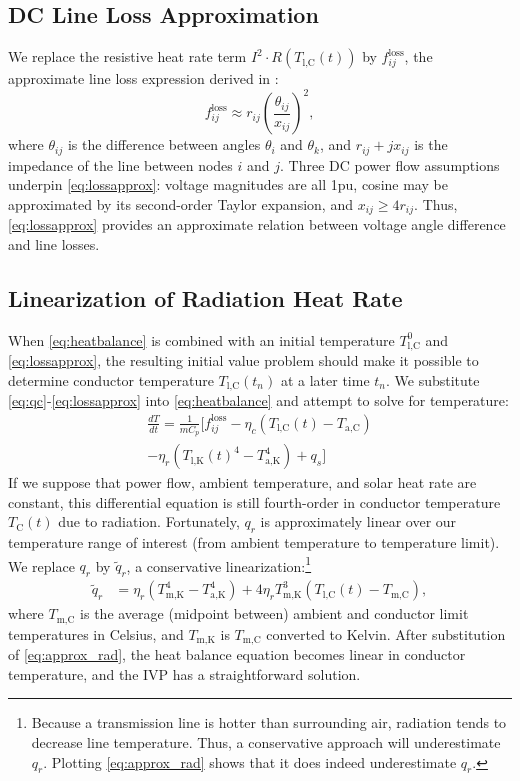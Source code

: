 \documentclass[journal,twoside]{IEEEtran}
\begin{document}
\subsection{DC Line Loss Approximation}
We replace the resistive heat rate term $I^2\cdot R(T_\text{l,C}(t))$ by $f_{ij}^\text{loss}$, the approximate line loss expression derived in \cite{almassalkhi2014}:
\begin{equation}\label{eq:lossapprox}
f_{ij}^{\text{loss}} \approx r_{ij}\left(\frac{\theta_{ij}}{x_{ij}}\right)^2,
\end{equation}
where $\theta_{ij}$ is the difference between angles $\theta_i$ and $\theta_k$, and $r_{ij} +j x_{ij}$ is the impedance of the line between nodes $i$ and $j$. Three DC power flow assumptions underpin \eqref{eq:lossapprox}: voltage magnitudes are all 1pu, cosine may be approximated by its second-order Taylor expansion, and $x_{ij} \geq 4r_{ij}$. Thus, \eqref{eq:lossapprox} provides an approximate relation between voltage angle difference and line losses.

\subsection{Linearization of Radiation Heat Rate}
When \eqref{eq:heatbalance} is combined with an initial temperature $T_\text{l,C}^0$ and \eqref{eq:lossapprox}, the resulting initial value problem should make it possible to determine conductor temperature $T_\text{l,C}(t_n)$ at a later time $t_n$. We substitute \eqref{eq:qc}-\eqref{eq:lossapprox} into \eqref{eq:heatbalance} and attempt to solve for temperature:
\begin{multline}\label{eq:heatbalance_approx}
\frac{dT}{dt} = \frac{1}{mC_p}\big[ f_{ij}^\text{loss} - \eta_c\left( T_\text{l,C}(t) - T_\text{a,C}\right) \\ - \eta_r\left(T_\text{l,K}(t)^4 - T_\text{a,K}^4\right) + q_s \big]
\end{multline}
If we suppose that power flow, ambient temperature, and solar heat rate are constant, this differential equation is still fourth-order in conductor temperature $T_\text{C}(t)$ due to radiation. Fortunately, $q_r$ is approximately linear over our temperature range of interest (from ambient temperature to temperature limit). We replace $q_r$ by $\tilde{q}_r$, a conservative linearization:\footnote{Because a transmission line is hotter than surrounding air, radiation tends to decrease line temperature. Thus, a conservative approach will underestimate $q_r$. Plotting \eqref{eq:approx_rad} shows that it does indeed underestimate $q_r$.}
\begin{align}\label{eq:approx_rad}
\tilde{q}_r &= \eta_r  \left( T_\text{m,K}^4 - T_\text{a,K}^4\right) +  4\eta_rT_\text{m,K}^3(T_\text{l,C}(t) - T_\text{m,C}),
\end{align}
where $T_\text{m,C}$ is the average (midpoint between) ambient and conductor limit temperatures in Celsius, and $T_\text{m,K}$ is $T_\text{m,C}$ converted to Kelvin. After substitution of \eqref{eq:approx_rad}, the heat balance equation becomes linear in conductor temperature, and the IVP has a straightforward solution.
\end{document}
